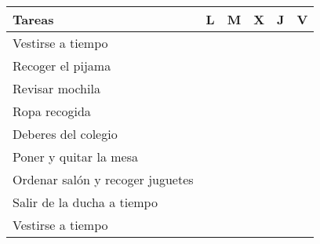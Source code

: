 \begin{longtable}[]{@{}llllll@{}}
\toprule
Tareas & L & M & X & J & V\tabularnewline
\midrule
\endhead
Vestirse a tiempo & & & & &\tabularnewline
Recoger el pijama & & & & &\tabularnewline
Revisar mochila & & & & &\tabularnewline
Ropa recogida & & & & &\tabularnewline
Deberes del colegio & & & & &\tabularnewline
Poner y quitar la mesa & & & & &\tabularnewline
Ordenar salón y recoger juguetes & & & & &\tabularnewline
Salir de la ducha a tiempo & & & & &\tabularnewline
Vestirse a tiempo & & & & &\tabularnewline
\bottomrule
\end{longtable}
